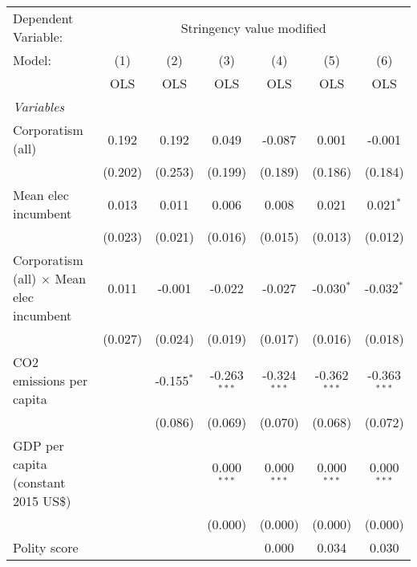 
\begingroup
\centering
\begin{tabular}{lcccccc}
   \toprule
   Dependent Variable: & \multicolumn{6}{c}{Stringency value modified}\\
   Model:                                          & (1)     & (2)          & (3)            & (4)            & (5)            & (6)\\  
                                                   &  OLS    & OLS          & OLS            & OLS            & OLS            & OLS\\  
   \midrule
   \emph{Variables}\\
   Corporatism (all)                               & 0.192   & 0.192        & 0.049          & -0.087         & 0.001          & -0.001\\   
                                                   & (0.202) & (0.253)      & (0.199)        & (0.189)        & (0.186)        & (0.184)\\   
   Mean elec incumbent                             & 0.013   & 0.011        & 0.006          & 0.008          & 0.021          & 0.021$^{*}$\\   
                                                   & (0.023) & (0.021)      & (0.016)        & (0.015)        & (0.013)        & (0.012)\\   
   Corporatism (all) $\times$ Mean elec incumbent  & 0.011   & -0.001       & -0.022         & -0.027         & -0.030$^{*}$   & -0.032$^{*}$\\   
                                                   & (0.027) & (0.024)      & (0.019)        & (0.017)        & (0.016)        & (0.018)\\   
   CO2 emissions per capita                        &         & -0.155$^{*}$ & -0.263$^{***}$ & -0.324$^{***}$ & -0.362$^{***}$ & -0.363$^{***}$\\   
                                                   &         & (0.086)      & (0.069)        & (0.070)        & (0.068)        & (0.072)\\   
   GDP per capita (constant 2015 US\$)             &         &              & 0.000$^{***}$  & 0.000$^{***}$  & 0.000$^{***}$  & 0.000$^{***}$\\   
                                                   &         &              & (0.000)        & (0.000)        & (0.000)        & (0.000)\\   
   Polity score                                    &         &              &                & 0.000          & 0.034          & 0.030\\   

\end{tabular}
